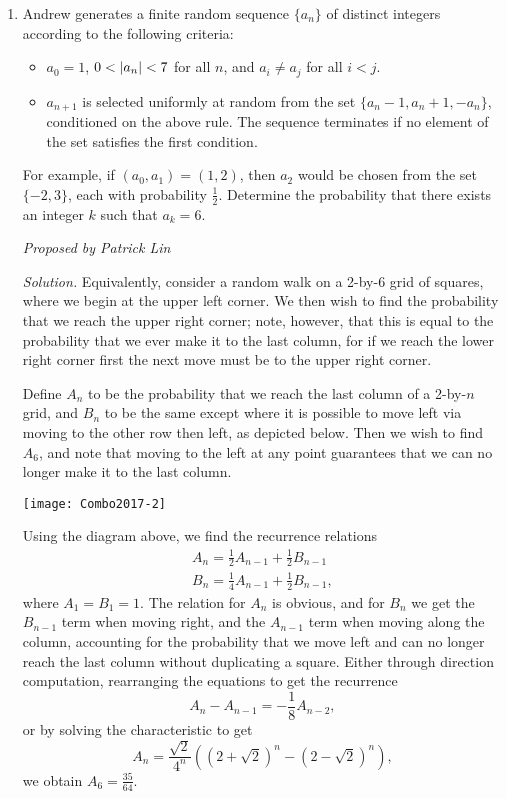 \documentclass[10pt]{article}
\newcounter{enum}
\newcommand{\proposed}[1]
{
\vspace{5pt}
\noindent\textit{Proposed by #1}
}
\newcommand{\solution}
{
\vspace{5pt}
\noindent\textit{Solution.}\qquad
}
\DeclarePairedDelimiter\abs{\lvert}{\rvert}
\begin{document}
\begin{enumerate}
\item Andrew generates a finite random sequence $\{a_n\}$ of distinct integers according to the following criteria:
\begin{itemize}
\item $a_0 = 1$, $0 < \abs{a_n} < 7$ for all $n$, and $a_i \neq a_j$ for all $i < j$.
\item $a_{n+1}$ is selected uniformly at random from the set $\{a_n - 1, a_n + 1, -a_n\}$, conditioned on the above rule. The sequence terminates if no element of the set satisfies the first condition.
\end{itemize}
For example, if $(a_0, a_1) = (1, 2)$, then $a_2$ would be chosen from the set $\{-2,3\}$, each with probability $\tfrac12$. Determine the probability that there exists an integer $k$ such that $a_k = 6$.

\proposed{Patrick Lin}

\solution Equivalently, consider a random walk on a 2-by-6 grid of squares, where we begin at the upper left corner. We then wish to find the probability that we reach the upper right corner; note, however, that this is equal to the probability that we ever make it to the last column, for if we reach the lower right corner first the next move must be to the upper right corner.

\par Define $A_n$ to be the probability that we reach the last column of a 2-by-$n$ grid, and $B_n$ to be the same except where it is possible to move left via moving to the other row then left, as depicted below. Then we wish to find $A_6$, and note that moving to the left at any point guarantees that we can no longer make it to the last column.

\begin{center}
\texttt{[image: Combo2017-2]}
\end{center}

\par Using the diagram above, we find the recurrence relations
\begin{gather*}
A_n = \frac12 A_{n-1} + \frac12 B_{n-1} \\
B_n = \frac14 A_{n-1} + \frac12 B_{n-1},
\end{gather*}
where $A_1 = B_1 = 1$. The relation for $A_n$ is obvious, and for $B_n$ we get the $B_{n-1}$ term when moving right, and the $A_{n-1}$ term when moving along the column, accounting for the probability that we move left and can no longer reach the last column without duplicating a square. Either through direction computation, rearranging the equations to get the recurrence
\[A_n - A_{n-1} = -\frac18 A_{n-2},\]
or by solving the characteristic to get
\[A_n = \frac{\sqrt{2}}{4^n}\left((2+\sqrt{2})^n - (2-\sqrt{2})^n\right),\]
we obtain $A_6 = \boxed{\tfrac{35}{64}}$.






\end{enumerate}
\end{document}
